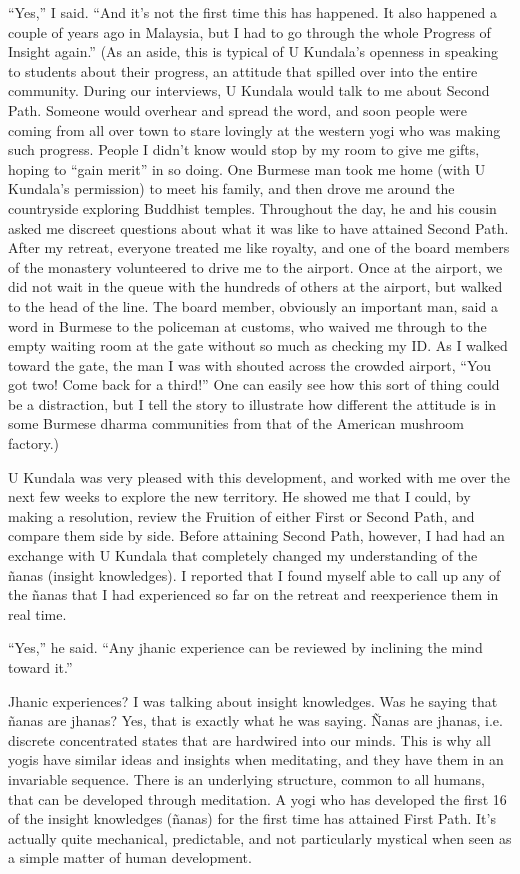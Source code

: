 \documentclass[a5paper,10pt,english]{book}
\begin{document}
\sphinxAtStartPar
“Yes,” I said. “And it’s not the first time this has happened. It also
happened a couple of years ago in Malaysia, but I had to go through the
whole Progress of Insight again.” (As an aside, this is typical of U
Kundala’s openness in speaking to students about their progress, an
attitude that spilled over into the entire community. During our
interviews, U Kundala would talk to me about Second Path. Someone would
overhear and spread the word, and soon people were coming from all over
town to stare lovingly at the western yogi who was making such progress.
People I didn’t know would stop by my room to give me gifts, hoping to
“gain merit” in so doing. One Burmese man took me home (with U Kundala’s
permission) to meet his family, and then drove me around the countryside
exploring Buddhist temples. Throughout the day, he and his cousin asked
me discreet questions about what it was like to have attained Second
Path. After my retreat, everyone treated me like royalty, and one of the
board members of the monastery volunteered to drive me to the airport.
Once at the airport, we did not wait in the queue with the hundreds of
others at the airport, but walked to the head of the line. The board
member, obviously an important man, said a word in Burmese to the
policeman at customs, who waived me through to the empty waiting room at
the gate without so much as checking my ID. As I walked toward the gate,
the man I was with shouted across the crowded airport, “You got two!
Come back for a third!” One can easily see how this sort of thing could
be a distraction, but I tell the story to illustrate how different the
attitude is in some Burmese dharma communities from that of the American
mushroom factory.)

\sphinxAtStartPar
U Kundala was very pleased with this development, and worked with me
over the next few weeks to explore the new territory. He showed me that
I could, by making a resolution, review the Fruition of either First or
Second Path, and compare them side by side. Before attaining Second
Path, however, I had had an exchange with U Kundala that completely
changed my understanding of the ñanas (insight knowledges). I reported
that I found myself able to call up any of the ñanas that I had
experienced so far on the retreat and re\sphinxhyphen{}experience them in real time.

\sphinxAtStartPar
“Yes,” he said. “Any jhanic experience can be reviewed by inclining the
mind toward it.”

\sphinxAtStartPar
Jhanic experiences? I was talking about insight knowledges. Was he
saying that ñanas are jhanas? Yes, that is exactly what he was saying.
Ñanas are jhanas, i.e. discrete concentrated states that are hardwired
into our minds. This is why all yogis have similar ideas and insights
when meditating, and they have them in an invariable sequence. There is
an underlying structure, common to all humans, that can be developed
through meditation. A yogi who has developed the first 16 of the insight
knowledges (ñanas) for the first time has attained First Path. It’s
actually quite mechanical, predictable, and not particularly mystical
when seen as a simple matter of human development.
\end{document}

